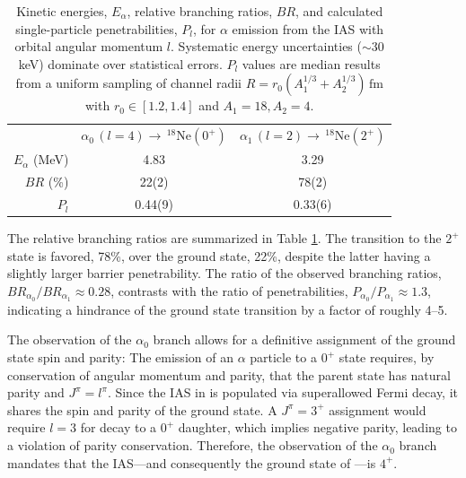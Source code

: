 \documentclass[

reprint,

superscriptaddress,









amsmath,amssymb,
aps,






floatfix,
prl
]{revtex4-2}
\begin{document}
\begin{table}
\caption{\label{tab:br-penet}
Kinetic energies, $E_\alpha$, relative branching ratios, $BR$, and calculated single-particle penetrabilities, $P_l$, for $\alpha$ emission from the \magn{} IAS with orbital angular momentum $l$.
Systematic energy uncertainties ($\sim$30 keV) dominate over statistical errors. $P_l$ values are median results from a uniform sampling of channel radii $R = r_0(A^{1/3}_1 + A^{1/3}_2) \, \mathrm{fm}$ with $r_0 \in [1.2, 1.4]$ and $A_1=18, A_2=4$.
}
\begin{ruledtabular}
\begin{tabular}{ r | c c }
                 & $\alpha_0 \, (l=4) \rightarrow \,^{18}\textrm{Ne}(0^+)$   & $\alpha_1 \, (l=2) \rightarrow \,^{18}\textrm{Ne}(2^+)$ \\
\colrule
$E_\alpha$ (MeV) & 4.83                                                      & 3.29                                                    \\
$BR$ (\%)        & 22(2)                                                     & 78(2)                                                   \\
$P_l$            & 0.44(9)                                                   & 0.33(6)
\end{tabular}
\end{ruledtabular}
\end{table}


The relative branching ratios are summarized in Table \ref{tab:br-penet}. The transition to the $2^+$ state is favored, 78\%, over the ground state, 22\%, despite the latter having a slightly larger barrier penetrability.
The ratio of the observed branching ratios, ${BR}_{\alpha_0}/{BR}_{\alpha_1} \approx 0.28$, contrasts with the ratio of penetrabilities, $P_{\alpha_0}/P_{\alpha_1} \approx 1.3$, indicating a hindrance of the ground state transition by a factor of roughly 4--5.

The observation of the $\alpha_0$ branch allows for a definitive assignment of the \alum{} ground state spin and parity:
The emission of an $\alpha$ particle to a $0^+$ state requires, by conservation of angular momentum and parity, that the parent state has natural parity and $J^\pi = l^\pi$.
Since the IAS in \magn{} is populated via superallowed Fermi decay, it shares the spin and parity of the \alum{} ground state.
A $J^\pi = 3^+$ assignment would require $l=3$ for decay to a $0^+$ daughter, which implies negative parity, leading to a violation of parity conservation.
Therefore, the observation of the $\alpha_0$ branch mandates that the IAS—and consequently the ground state of \alum{}—is $4^+$.
\end{document}
